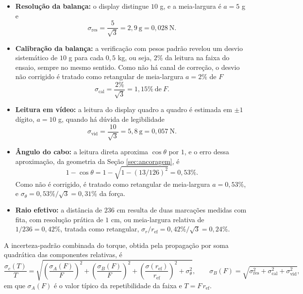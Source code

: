 \begin{itemize}
    \item \textbf{Resolução da balança:} o display distingue $10$ g, e a meia-largura
    é $a = 5$ g e
    \[
    \sigma_{\mathrm{res}} = \frac{5}{\sqrt{3}} = 2{,}9\ \mathrm{g} = 0{,}028\ \mathrm{N}.
    \]
    \item \textbf{Calibração da balança:} a verificação com pesos padrão revelou um desvio
    sistemático de $10$ g para cada $0{,}5$ kg, ou seja, $2\%$ da leitura na faixa do
    ensaio, sempre no mesmo sentido. Como não há canal de correção, o desvio não corrigido
    é tratado como retangular de meia-largura $a = 2\%$ de $F$
    \[
    \sigma_{\mathrm{cal}} = \frac{2\%}{\sqrt{3}} = 1{,}15\% \ \text{de}\ F.
    \]
    \item \textbf{Leitura em vídeo:} a leitura do display quadro a quadro é estimada em
    $\pm 1$ dígito, $a = 10$ g, quando há dúvida de legibilidade
    \[
    \sigma_{\mathrm{vid}} = \frac{10}{\sqrt{3}} = 5{,}8\ \mathrm{g} = 0{,}057\ \mathrm{N}.
    \]
    \item \textbf{Ângulo do cabo:} a leitura direta aproxima $\cos\theta$ por $1$, e o erro
    dessa aproximação, da geometria da Seção \ref{sec:ancoragem}, é
    \[
    1 - \cos\theta = 1 - \sqrt{1 - (13/126)^2} = 0{,}53\%.
    \]
    Como não é corrigido, é tratado como retangular de meia-largura $a = 0{,}53\%$,
    e $\sigma_{\theta} = 0{,}53\%/\sqrt{3} = 0{,}31\%$ da força.
    \item \textbf{Raio efetivo:} a distância de $236$ cm resulta de duas marcações medidas
    com fita, com resolução prática de $1$ cm, ou meia-largura relativa de $1/236 =
    0{,}42\%$, tratada como retangular, $\sigma_r/r_\mathrm{ef} = 0{,}42\%/\sqrt{3} =
    0{,}24\%$.
\end{itemize}

A incerteza-padrão combinada do torque, obtida pela propagação por soma quadrática das
componentes relativas, é
\begin{equation}\label{eq:propagacao}
\frac{\sigma_c(T)}{T} = \sqrt{\left(\frac{\sigma_A(F)}{F}\right)^2
                        + \left(\frac{\sigma_B(F)}{F}\right)^2
                        + \left(\frac{\sigma(r_\mathrm{ef})}{r_\mathrm{ef}}\right)^2
                        + \sigma_{\theta}^2},
\qquad
\sigma_B(F) = \sqrt{\sigma_{\mathrm{res}}^2 + \sigma_{\mathrm{cal}}^2 +
\sigma_{\mathrm{vid}}^2},
\end{equation}
em que $\sigma_A(F)$ é o valor típico da repetibilidade da faixa e $T = F\,r_\mathrm{ef}$.

